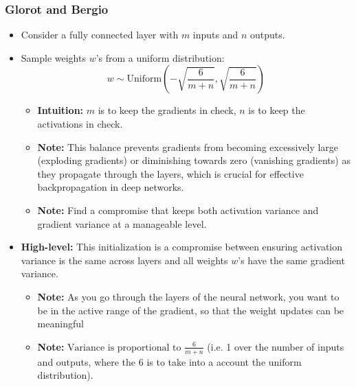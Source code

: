 \subsubsection{Glorot and Bergio}
\begin{summary}
    \begin{itemize}
        \item Consider a fully connected layer with \( m \) inputs and \( n \) outputs.
        
        \item Sample weights \( w \)'s from a uniform distribution:
        \[
        w \sim \text{Uniform}\left(-\sqrt{\frac{6}{m+n}}, \sqrt{\frac{6}{m+n}}\right)
        \]
        \begin{itemize}
            \item \textbf{Intuition:} $m$ is to keep the gradients in check, $n$ is to keep the activations in check. 
            \item \textbf{Note:} This balance prevents gradients from becoming excessively large (exploding gradients) or diminishing towards zero (vanishing gradients) as they propagate through the layers, which is crucial for effective backpropagation in deep networks.
            \item \textbf{Note:} Find a compromise that keeps both activation variance and gradient variance at a manageable level.
        \end{itemize}
    
        \item \textbf{High-level:} This initialization is a compromise between ensuring activation variance is the same across layers and all weights \( w \)'s have the same gradient variance.
        \begin{itemize}
            \item \textbf{Note:} As you go through the layers of the neural network, you want to be in the active range of the gradient, so that the weight updates can be meaningful
            \item \textbf{Note:} $\text{Variance is proportional to } \frac{6}{m+n}$ (i.e. 1 over the number of inputs and outputs, where the 6 is to take into a account the uniform distribution).
        \end{itemize}
    \end{itemize}
\end{summary}

